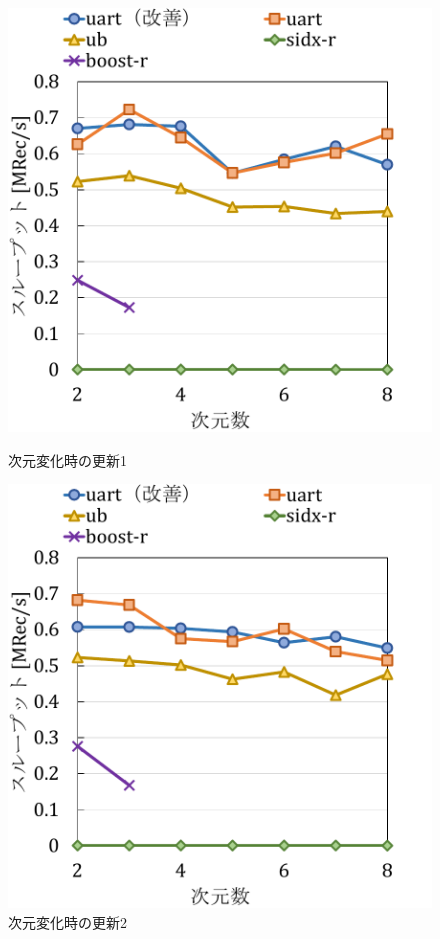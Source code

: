 \begin{figure}[tb]
  \begin{minipage}[c]{0.495\textwidth}
    \centering
    \includegraphics[scale=0.5]{./figures/graph-dimention-update-0.pdf}
    \caption{次元変化時の更新1}
    \label{graph:grouped}
  \end{minipage}
  \begin{minipage}[c]{0.495\textwidth}
    \centering
    \includegraphics[scale=0.5]{./figures/graph-dimention-update-0.5.pdf}
    \caption{次元変化時の更新2}
    \label{graph:paired}
  \end{minipage}
\end{figure}

